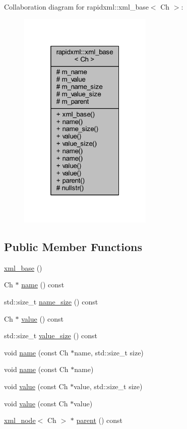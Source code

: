 Collaboration diagram for rapidxml\+:\+:xml\+\_\+base$<$ Ch $>$\+:\nopagebreak
\begin{figure}[H]
\begin{center}
\leavevmode
\includegraphics[width=181pt]{classrapidxml_1_1xml__base__coll__graph}
\end{center}
\end{figure}
\subsection*{Public Member Functions}
\begin{DoxyCompactItemize}
\item 
\hyperlink{classrapidxml_1_1xml__base_a23e7f7aac02d17a0a01afb597e4b966b}{xml\+\_\+base} ()
\item 
Ch $\ast$ \hyperlink{classrapidxml_1_1xml__base_a9a09739310469995db078ebd0da3ed45}{name} () const 
\item 
std\+::size\+\_\+t \hyperlink{classrapidxml_1_1xml__base_a7e7f98b3d01e1eab8dc1ca69aad9af84}{name\+\_\+size} () const 
\item 
Ch $\ast$ \hyperlink{classrapidxml_1_1xml__base_adcdaccff61c665f039d9344e447b7445}{value} () const 
\item 
std\+::size\+\_\+t \hyperlink{classrapidxml_1_1xml__base_a9fcf201ed0915ac18dd43b0b5dcfaf32}{value\+\_\+size} () const 
\item 
void \hyperlink{classrapidxml_1_1xml__base_ae55060ae958c6e6465d6c8db852ec6ce}{name} (const Ch $\ast$name, std\+::size\+\_\+t size)
\item 
void \hyperlink{classrapidxml_1_1xml__base_a4611ddc82ac83a527c65606600eb2a0d}{name} (const Ch $\ast$name)
\item 
void \hyperlink{classrapidxml_1_1xml__base_a3b183c2db7022a6d30494dd2f0ac11e9}{value} (const Ch $\ast$value, std\+::size\+\_\+t size)
\item 
void \hyperlink{classrapidxml_1_1xml__base_a81e63ec4bfd2d7ef0a6c2ed49be6e623}{value} (const Ch $\ast$value)
\item 
\hyperlink{singletonrapidxml_1_1xml__node}{xml\+\_\+node}$<$ Ch $>$ $\ast$ \hyperlink{classrapidxml_1_1xml__base_a7f31ae930f93852830234db1ae59c4c4}{parent} () const 
\end{DoxyCompactItemize}
